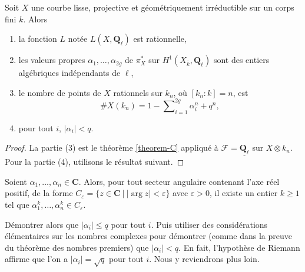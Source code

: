 \begin{lemma}
\label{lemma-count-points-projective}
Soit $X$ une courbe lisse, projective et géométriquement irréductible
sur un corps fini $k$. Alors
\begin{enumerate}
\item la fonction $L$ notée $L(X, \mathbf{Q}_\ell)$ est rationnelle,
\item les valeurs propres $\alpha_1, \ldots, \alpha_{2g}$ de $\pi_X^*$ sur
$H^1(X_{\bar k}, \mathbf{Q}_\ell)$ sont des entiers algébriques
indépendants de $\ell$,
\item le nombre de points de $X$ rationnels sur $k_n$, où $[k_n : k] = n$, est
$$
\# X(k_n) = 1 - \sum\nolimits_{i = 1}^{2g}\alpha_i^n + q^n,
$$
\item pour tout $i$, $|\alpha_i| < q$.
\end{enumerate}
\end{lemma}

\begin{proof}
La partie (3) est le théorème \ref{theorem-C} appliqué à $\mathcal{F} =
\underline{\mathbf{Q}_\ell}$ sur $X \otimes k_n$. Pour la partie (4), utilisons le
résultat suivant.
\end{proof}

\begin{exercise}
\label{exercise-powers}
Soient $\alpha_1, \ldots, \alpha_n \in \mathbf{C}$. Alors, pour tout secteur angulaire
contenant l'axe réel positif, de la forme $C_\varepsilon = \{ z \in
\mathbf{C} \ | \ |\arg z| < \varepsilon \}$ avec $\varepsilon > 0$, il existe
un entier $k \geq 1$ tel que $\alpha_1^k, \ldots, \alpha_n^k \in
C_\varepsilon$.
\end{exercise}

\noindent
Démontrer alors que $|\alpha_i| \leq q$ pour tout $i$. Puis utiliser des
considérations élémentaires sur les nombres complexes pour démontrer (comme dans la preuve du théorème
des nombres premiers) que $|\alpha_i| < q$. En fait, l'hypothèse de Riemann affirme que
l'on a $|\alpha_i| = \sqrt{q}$ pour tout $i$. Nous y reviendrons plus loin.

